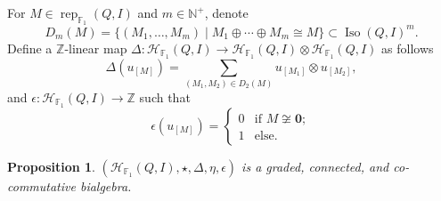 \documentclass[12pt]{amsart}
\newtheorem{proposition}[theorem]{Proposition}
\theoremstyle{remark}
\theoremstyle{definition}
\numberwithin{equation}{section}
\begin{document}
For ${M}\in \operatorname{rep}_{\mathbb{F}_1}(Q,I)$ and $m\in \mathbb{N}^+$, denote 
\[
D_m({M})=\{({M}_1,\ldots,{M}_m)\mid {M}_1\oplus\cdots\oplus {M}_m\cong {M}\}\subset \operatorname{Iso}(Q,I)^m.
\]
Define a $\mathbb{Z}$-linear map $\Delta:\mathcal{H}_{\mathbb{F}_1}(Q,I)\to \mathcal{H}_{\mathbb{F}_1}(Q,I)\otimes \mathcal{H}_{\mathbb{F}_1}(Q,I)$ as follows
\[
\Delta(u_{[{M}]})=\sum_{({M}_1,{M}_2)\in D_2({M})}u_{[{M}_1]}\otimes u_{[{M_2}]},
\]
and $\epsilon:\mathcal{H}_{\mathbb{F}_1}(Q,I)\to \mathbb{Z}$ such that
\[
\epsilon(u_{[{M}]})=\begin{cases}
    0& \text{if ${M}\not\cong \mathbf{0}$};\\
    1& \text{else}.
\end{cases}
\]
\begin{proposition}\label{prop:hall-algebra-biaglebra}
    $(\mathcal{H}_{\mathbb{F}_1}(Q,I),\star, \Delta, \eta,\epsilon)$ is a graded, connected, and co-commutative bialgebra.
\end{proposition}
\end{document}

